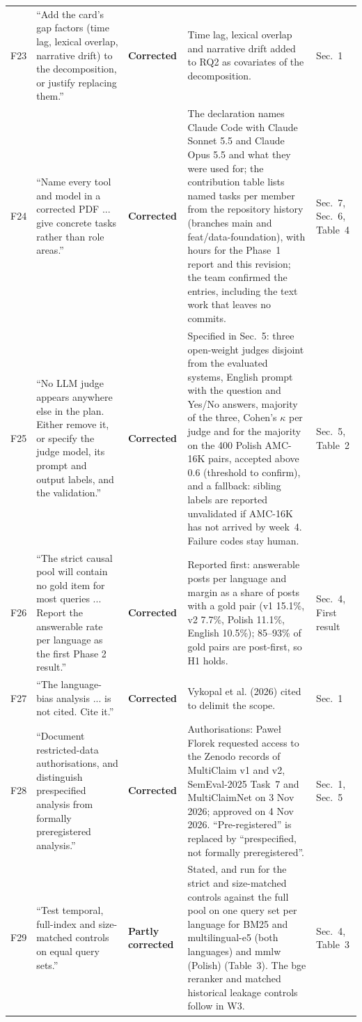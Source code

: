 \documentclass[10pt]{article}
\newcommand{\done}{\textbf{Corrected}}
\newcommand{\partly}{\textbf{Partly corrected}}
\begin{document}
\begin{longtable}{@{}l p{4.6cm} p{1.6cm} p{8.6cm} p{4.2cm}@{}}
F23 & ``Add the card's gap factors (time lag, lexical overlap, narrative drift) to the decomposition, or justify replacing them.'' & \done & Time lag, lexical overlap and narrative drift added to RQ2 as covariates of the decomposition. & Sec.~1 \\
F24 & ``Name every tool and model in a corrected PDF ... give concrete tasks rather than role areas.'' & \done & The declaration names Claude Code with Claude Sonnet 5.5 and Claude Opus 5.5 and what they were used for; the contribution table lists named tasks per member from the repository history (branches main and feat/data-foundation), with hours for the Phase~1 report and this revision; the team confirmed the entries, including the text work that leaves no commits. & Sec.~7, Sec.~6, Table~4 \\
F25 & ``No LLM judge appears anywhere else in the plan. Either remove it, or specify the judge model, its prompt and output labels, and the validation.'' & \done & Specified in Sec.~5: three open-weight judges disjoint from the evaluated systems, English prompt with the question and Yes/No answers, majority of the three, Cohen's $\kappa$ per judge and for the majority on the 400 Polish AMC-16K pairs, accepted above 0.6 (threshold to confirm), and a fallback: sibling labels are reported unvalidated if AMC-16K has not arrived by week~4. Failure codes stay human. & Sec.~5, Table~2 \\
F26 & ``The strict causal pool will contain no gold item for most queries ... Report the answerable rate per language as the first Phase 2 result.'' & \done & Reported first: answerable posts per language and margin as a share of posts with a gold pair (v1 15.1\%, v2 7.7\%, Polish 11.1\%, English 10.5\%); 85--93\% of gold pairs are post-first, so H1 holds. & Sec.~4, First result \\
F27 & ``The language-bias analysis ... is not cited. Cite it.'' & \done & Vykopal et al. (2026) cited to delimit the scope. & Sec.~1 \\
F28 & ``Document restricted-data authorisations, and distinguish prespecified analysis from formally preregistered analysis.'' & \done & Authorisations: Pawe{\l} Florek requested access to the Zenodo records of MultiClaim v1 and v2, SemEval-2025 Task~7 and MultiClaimNet on 3 Nov 2026; approved on 4 Nov 2026. ``Pre-registered'' is replaced by ``prespecified, not formally preregistered''. & Sec.~1, Sec.~5 \\
F29 & ``Test temporal, full-index and size-matched controls on equal query sets.'' & \partly & Stated, and run for the strict and size-matched controls against the full pool on one query set per language for BM25 and multilingual-e5 (both languages) and mmlw (Polish) (Table~3). The bge reranker and matched historical leakage controls follow in W3. & Sec.~4, Table~3 \\

\end{longtable}
\end{document}

